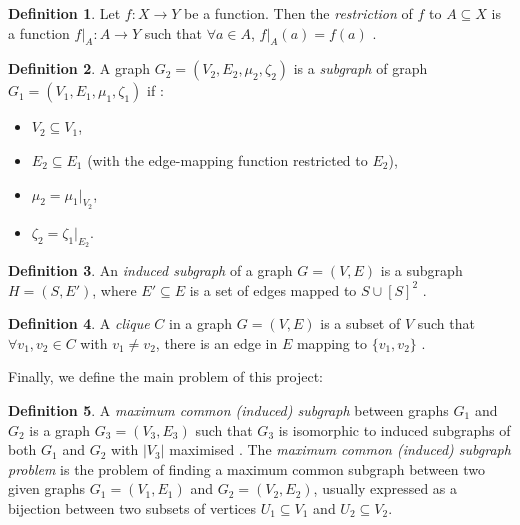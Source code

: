 \documentclass{l4proj}
\theoremstyle{definition}
\newtheorem{definition}{Definition}[chapter]
\theoremstyle{remark}
\begin{document}
\begin{definition}
  Let $f \colon X \to Y$ be a function. Then the \emph{restriction} of $f$ to $A
  \subseteq X$ is a function $f|_A \colon A \to Y$ such that $\forall a \in A$,
  $f|_A(a) = f(a)$ \cite{stoll1979set}.
\end{definition}

\begin{definition} A graph $G_2 = (V_2, E_2, \mu_2, \zeta_2)$ is a
  \emph{subgraph} of graph $G_1 = (V_1, E_1, \mu_1, \zeta_1)$ if
  \cite{DBLP:books/daglib/0030488}:
  \begin{itemize}
  \item $V_2 \subseteq V_1$,
  \item $E_2 \subseteq E_1$ (with the edge-mapping function restricted to
    $E_2$),
  \item $\mu_2 = \mu_1|_{V_2}$,
  \item $\zeta_2 = \zeta_1|_{E_2}$.
  \end{itemize}
\end{definition}

\begin{definition} \label{def:induced_subgraph}
  An \emph{induced subgraph} of a graph $G = (V, E)$ is a subgraph $H = (S,
  E')$, where $E' \subseteq E$ is a set of edges mapped to $S \cup [S]^2$
  \cite{DBLP:journals/jcamd/RaymondW02a}.
\end{definition}

\begin{definition}
  A \emph{clique} $C$ in a graph $G = (V, E)$ is a subset of $V$ such that
  $\forall v_1, v_2 \in C$ with $v_1 \ne v_2$, there is an edge in $E$ mapping
  to $\{ v_1, v_2 \}$ \cite{DBLP:journals/jgo/PardalosX94a}.
\end{definition}

Finally, we define the main problem of this project:

\begin{definition}
  A \emph{maximum common (induced) subgraph} between graphs $G_1$ and $G_2$ is a
  graph $G_3 = (V_3, E_3)$ such that $G_3$ is isomorphic to induced subgraphs of
  both $G_1$ and $G_2$ with $|V_3|$ maximised
  \cite{DBLP:journals/jcamd/RaymondW02a}. The \emph{maximum common (induced)
    subgraph problem} is the problem of finding a maximum common subgraph
  between two given graphs $G_1 = (V_1, E_1)$ and $G_2 = (V_2, E_2)$, usually
  expressed as a bijection between two subsets of vertices $U_1 \subseteq V_1$
  and $U_2 \subseteq V_2$.
\end{definition}
\end{document}
